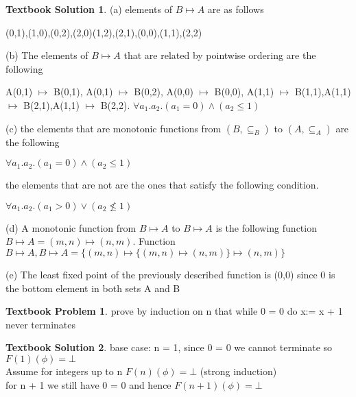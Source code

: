 \documentclass[10pt]{article}
\theoremstyle{definition}
\newtheorem{bp}{Textbook Problem}
\newtheorem{ts}{Textbook Solution}
\begin{document}
  \begin{ts}

  

  (a) elements of $ B \mapsto A$ are as follows

  

  (0,1),(1,0),(0,2),(2,0)(1,2),(2,1),(0,0),(1,1),(2,2)

  

  (b) The elements of $ B \mapsto A$ that are related by pointwise ordering are the following

  

  A(0,1) $\mapsto$ B(0,1), A(0,1) $\mapsto$ B(0,2), A(0,0) $\mapsto$ B(0,0), A(1,1) $\mapsto$ B(1,1),A(1,1) $\mapsto$ B(2,1),A(1,1) $\mapsto$ B(2,2). 
  $ \forall a_1.a_2. (a_1 = 0) \wedge (a_2 \leq 1) $
  

  (c) the elements that are monotonic functions from $(B,\subseteq_B)$ to $(A,\subseteq_A)$ are the following
    
    $ \forall a_1.a_2. (a_1 = 0) \wedge (a_2 \leq 1) $
    
    the elements that are not are the ones that satisfy the following condition.
    
    $ \forall a_1.a_2. (a_1 > 0) \vee (a_2 \not \leq 1) $

  

  (d) A monotonic function from $B \mapsto A$ to $B \mapsto A$ is the following
    function $B \mapsto A = (m,n) \mapsto (n,m)$. Function $B \mapsto A, B \mapsto A= \{(m,n) \mapsto \{(m,n) \mapsto (n,m)\} \mapsto (n,m)\}$
  
  (e) The least fixed point of the previously described function is (0,0) since 0 is the bottom element in both sets A and B

  \end{ts}
  
  \begin{bp}
      prove by induction on n that while 0 = 0 do x:= x + 1 never terminates
  \end{bp}
  
  \begin{ts}
  base case: n = 1, since 0 = 0 we cannot terminate so $F(1)(\phi) = \bot$ \\
  Assume for integers up to n $F(n)(\phi) = \bot$ (strong induction) \\
  for n + 1 we still have 0 = 0 and hence $F(n+1)(\phi) = \bot$
  \end{ts}

  

  

  
\end{document}
